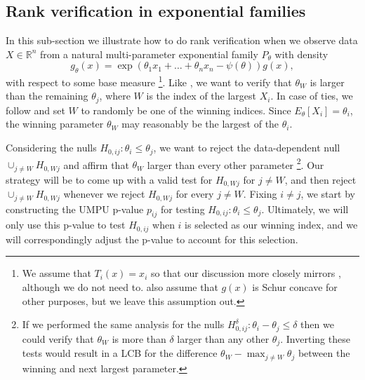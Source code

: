 \documentclass{article}
\newcommand{\R}{\mathbb{R}}
\begin{document}
\subsection{Rank verification in exponential families}

In this sub-section we illustrate how to do rank verification when we observe data $X \in \R^n$ from a natural multi-parameter exponential family $P_{\theta}$ with density
\begin{equation}
    \label{eq:exp_fam}
    g_{\theta}(x) = \exp(\theta_1 x_1 + \dots + \theta_n x_n - \psi(\theta))g(x),
\end{equation}
with respect to some base measure \footnote{We assume that $T_i(x) = x_i$ so that our discussion more closely mirrors \cite{Hung2019}, although we do not need to. \cite{Hung2019} also assume that $g(x)$ is Schur concave for other purposes, but we leave this assumption out.}. Like \cite{Hung2019}, we want to verify that $\theta_W$ is larger than the remaining $\theta_j$, where $W$ is the index of the largest $X_i$. In case of ties, we follow \cite{Hung2019} and set $W$ to randomly be one of the winning indices. Since $E_{\theta}[X_i] = \theta_i$, the winning parameter $\theta_W$ may reasonably be the largest of the $\theta_i$. 

Considering the nulls $H_{0, ij} : \theta_i \leq \theta_j$, we want to reject the data-dependent null $\cup_{j \neq W} H_{0, Wj} $ and affirm that $\theta_W$ larger than every other parameter \footnote{If we performed the same analysis for the nulls $H^{\delta}_{0, ij} : \theta_i  - \theta_j \leq \delta$ then we could verify that $\theta_W$ is more than $\delta$ larger than any other $\theta_j$. Inverting these tests would result in a LCB for the difference $\theta_W - \max_{j \neq W } \theta_j$ between the winning and next largest parameter.}. Our strategy will be to come up with a valid test for $H_{0, Wj}$ for $j \neq W$, and then reject $\cup_{j \neq W} H_{0, Wj}$ whenever we reject $H_{0, Wj}$ for every $j \neq W$. Fixing $i \neq j$, we start by constructing the UMPU p-value $p_{ij}$ for testing $H_{0, ij}: \theta_i \leq \theta_j$. Ultimately, we will only use this p-value to test $H_{0, ij}$ when $i$ is selected as our winning index, and we will correspondingly adjust the p-value to account for this selection. 
\end{document}

